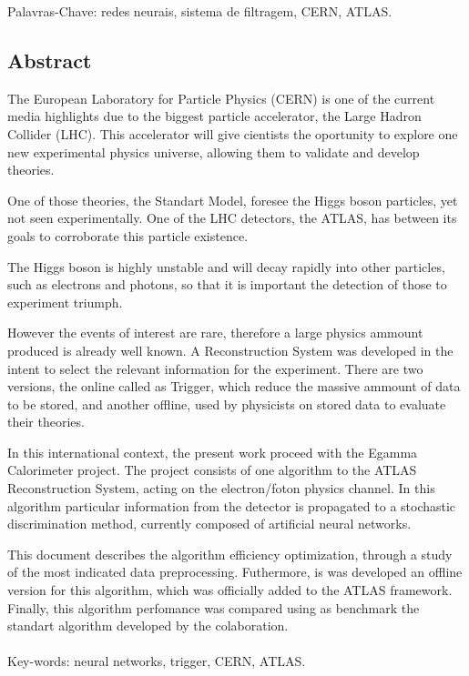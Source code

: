 \noindent Palavras-Chave:  redes neurais, sistema de filtragem, CERN, ATLAS.

\vfill

\cleardoublepage

\vfill
\begin{center}
\section*{Abstract\label{Abstract}}
\end{center}

The European Laboratory for Particle Physics (CERN) is one of the current
media highlights due to the biggest particle accelerator, the Large Hadron
Collider (LHC). This accelerator will give cientists the oportunity to explore 
one new experimental physics universe, allowing them to validate and develop
theories.

One of those theories, the Standart Model, foresee the Higgs boson particles,
yet not seen experimentally. One of the LHC detectors, the ATLAS, has between
its goals to corroborate this particle existence.

The Higgs boson is highly unstable and will decay rapidly into other particles,
such as electrons and photons, so that it is important the detection of those to
experiment triumph.

However the events of interest are rare, therefore a large physics ammount
produced is already well known. A Reconstruction System was developed in the
intent to select the relevant information for the experiment. There are two
versions, the online called as Trigger, which reduce the massive ammount of data
to be stored, and another offline, used by physicists on stored data to evaluate
their theories.

In this international context, the present work proceed with the Egamma
Calorimeter project. The project consists of one algorithm to the ATLAS
Reconstruction System, acting on the electron/foton physics channel. In this
algorithm particular information from the detector is propagated to a stochastic
discrimination method, currently composed of artificial neural networks.

This document describes the algorithm efficiency optimization, through a study
of the most indicated data preprocessing. Futhermore, is was developed an
offline version for this algorithm, which was officially added to the ATLAS
framework. Finally, this algorithm perfomance was compared using as benchmark
the standart algorithm developed by the colaboration.


\paragraph{}

\noindent Key-words: neural networks, trigger, CERN, ATLAS.


\vfill
